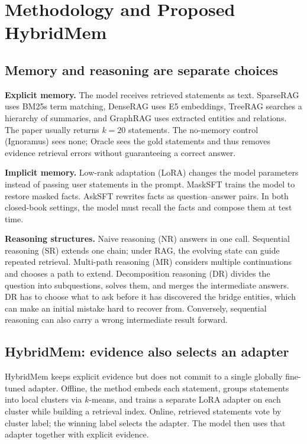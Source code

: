 \documentclass[sigconf,nonacm,10pt,balance=false]{acmart}
\newcommand{\emphlabel}[1]{\par\smallskip\noindent\textbf{#1}\enspace}
\begin{document}
\section{Methodology and Proposed HybridMem}
\subsection{Memory and reasoning are separate choices}
\emphlabel{Explicit memory.} The model receives retrieved statements as text. SparseRAG uses BM25s term matching, DenseRAG uses E5 embeddings, TreeRAG searches a hierarchy of summaries, and GraphRAG uses extracted entities and relations. The paper usually returns $k=20$ statements. The no-memory control (Ignoramus) sees none; Oracle sees the gold statements and thus removes evidence retrieval errors without guaranteeing a correct answer.

\emphlabel{Implicit memory.} Low-rank adaptation (LoRA) changes the model parameters instead of passing user statements in the prompt. MaskSFT trains the model to restore masked facts. AskSFT rewrites facts as question--answer pairs. In both closed-book settings, the model must recall the facts and compose them at test time.

\emphlabel{Reasoning structures.} Naive reasoning (NR) answers in one call. Sequential reasoning (SR) extends one chain; under RAG, the evolving state can guide repeated retrieval. Multi-path reasoning (MR) considers multiple continuations and chooses a path to extend. Decomposition reasoning (DR) divides the question into subquestions, solves them, and merges the intermediate answers. DR has to choose what to ask before it has discovered the bridge entities, which can make an initial mistake hard to recover from. Conversely, sequential reasoning can also carry a wrong intermediate result forward.

\subsection{HybridMem: evidence also selects an adapter}
HybridMem keeps explicit evidence but does not commit to a single globally fine-tuned adapter. Offline, the method embeds each statement, groups statements into local clusters via $k$-means, and trains a separate LoRA adapter on each cluster while building a retrieval index. Online, retrieved statements vote by cluster label; the winning label selects the adapter. The model then uses that adapter together with explicit evidence.
\end{document}
